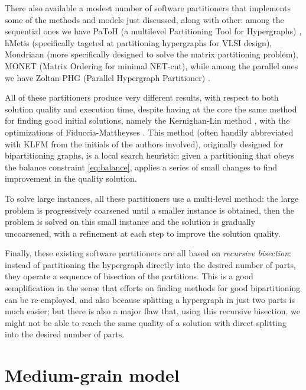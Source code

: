 There also available a modest number of software partitioners that implements some of the methods and models just discussed, along with other: among the sequential ones we have PaToH (a multilevel Partitioning Tool for Hypergraphs) \cite{patoh}, hMetis \cite{hmetis} (specifically tageted at partitioning hypergraphs for VLSI design), Mondriaan \cite{mondriaan} (more specifically designed to solve the matrix partitioning problem), MONET (Matrix Ordering for minimal NET-cut)\cite{hu2000}, while among the parallel ones we have Zoltan-PHG (Parallel Hypergraph Partitioner) \cite{parallel_hypergraph}.

All of these partitioners produce very different results, with respect to both solution quality and execution time, despite having at the core the same method for finding good initial solutions, namely the Kernighan-Lin method \cite{kernighan_lin}, with the optimizations of Fiduccia-Mattheyses \cite{fiduccia}. This method (often handily abbreviated with KLFM from the initials of the authors involved), originally designed for bipartitioning graphs, is a local search heuristic: given a partitioning that obeys the balance constraint \eqref{eq:balance}, applies a series of small changes to find improvement in the quality solution.

To solve large instances, all these partitioners use a multi-level method: the large problem is progressively coarsened until a smaller instance is obtained, then the problem is solved on this small instance and the solution is gradually uncoarsened, with a refinement at each step to improve the solution quality.

Finally, these existing software partitioners are all based on \emph{recursive bisection}: instead of partitioning the hypergraph directly into the desired number of parts, they operate a sequence of bisection of the partitions. This is a good semplification in the sense that efforts on finding methods for good bipartitioning can be re-employed, and also because splitting a hypergraph in just two parts is much easier; but there is also a major flaw that, using this recursive bisection, we might not be able to reach the same quality of a solution with direct splitting into the desired number of parts.

\section{Medium-grain model} \label{sec:mediumgrain}
